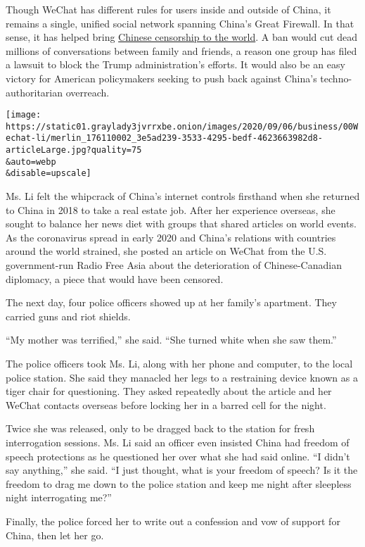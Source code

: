 Though WeChat has different rules for users inside and outside of China,
it remains a single, unified social network spanning China's Great
Firewall. In that sense, it has helped bring
\href{https://www.nytimes3xbfgragh.onion/2018/03/02/technology/china-technology-censorship-borders-expansion.html}{Chinese
censorship to the world}. A ban would cut dead millions of conversations
between family and friends, a reason one group has filed a lawsuit to
block the Trump administration's efforts. It would also be an easy
victory for American policymakers seeking to push back against China's
techno-authoritarian overreach.

\texttt{[image: https://static01.graylady3jvrrxbe.onion/images/2020/09/06/business/00Wechat-li/merlin\_176110002\_3e5ad239-3533-4295-bedf-4623663982d8-articleLarge.jpg?quality=75\\\&auto=webp\\\&disable=upscale]}

Ms. Li felt the whipcrack of China's internet controls firsthand when
she returned to China in 2018 to take a real estate job. After her
experience overseas, she sought to balance her news diet with groups
that shared articles on world events. As the coronavirus spread in early
2020 and China's relations with countries around the world strained, she
posted an article on WeChat from the U.S. government-run Radio Free Asia
about the deterioration of Chinese-Canadian diplomacy, a piece that
would have been censored.

The next day, four police officers showed up at her family's apartment.
They carried guns and riot shields.

``My mother was terrified,'' she said. ``She turned white when she saw
them.''

The police officers took Ms. Li, along with her phone and computer, to
the local police station. She said they manacled her legs to a
restraining device known as a tiger chair for questioning. They asked
repeatedly about the article and her WeChat contacts overseas before
locking her in a barred cell for the night.

Twice she was released, only to be dragged back to the station for fresh
interrogation sessions. Ms. Li said an officer even insisted China had
freedom of speech protections as he questioned her over what she had
said online. ``I didn't say anything,'' she said. ``I just thought, what
is your freedom of speech? Is it the freedom to drag me down to the
police station and keep me night after sleepless night interrogating
me?''

Finally, the police forced her to write out a confession and vow of
support for China, then let her go.

